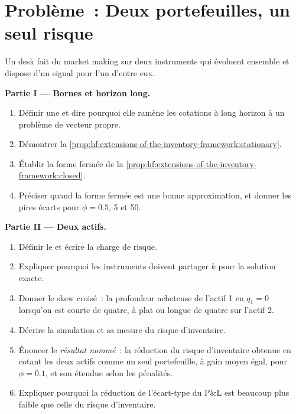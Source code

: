 \section{Problème~: Deux portefeuilles, un seul risque}

\begin{problem}\label{pb:hf:extensions-of-the-inventory-framework:1}
Un desk fait du market making sur deux instruments qui évoluent ensemble et dispose d'un signal pour l'un d'entre eux.

\medskip\noindent\textbf{Partie I --- Bornes et horizon long.}
\begin{enumerate}
\item Définir une  et dire pourquoi elle ramène les cotations à long horizon à un
problème de vecteur propre.
\item Démontrer la \cref{prop:hf:extensions-of-the-inventory-framework:stationary}.
\item Établir la forme fermée de la \cref{prop:hf:extensions-of-the-inventory-framework:closed}.
\item Préciser quand la forme fermée est une bonne approximation, et donner les pires écarts pour $\phi=0.5$, 5 et 50.
\end{enumerate}

\medskip\noindent\textbf{Partie II --- Deux actifs.}
\begin{enumerate}[resume]
\item Définir le  et écrire la charge de risque.
\item Expliquer pourquoi les instruments doivent partager $k$ pour la solution exacte.
\item Donner le skew croisé~: la profondeur acheteuse de l'actif 1 en $q_1=0$ lorsqu'on est courte de quatre, à plat ou longue de quatre sur l'actif 2.
\item Décrire la simulation et sa mesure du risque d'inventaire.
\item Énoncer le \emph{résultat nommé}~: la réduction du risque d'inventaire obtenue en cotant les deux actifs comme un seul portefeuille, à gain moyen égal, pour $\phi=0.1$,
et son étendue selon les pénalités.
\item Expliquer pourquoi la réduction de l'écart-type du P\&L est beaucoup plus faible que celle du risque d'inventaire.
\end{enumerate}


\end{problem}
